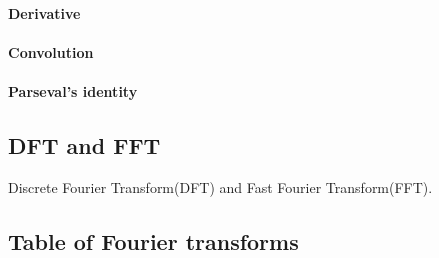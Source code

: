 \paragraph{Derivative}
\paragraph{Convolution}


\paragraph{Parseval's identity}


\subsection{DFT and FFT}
Discrete Fourier Transform(DFT) and Fast Fourier Transform(FFT).

\subsection{Table of Fourier transforms}
